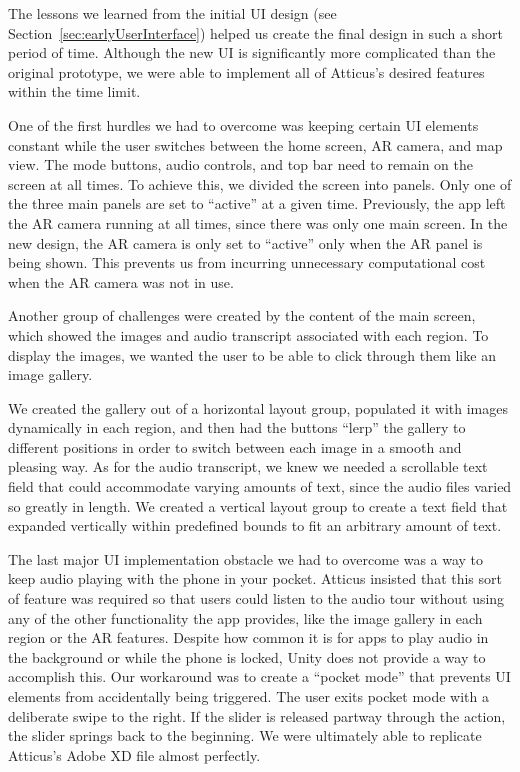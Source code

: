 \documentclass[a4paper, 10pt, american, titlepage]{article}
\begin{document}
The lessons we learned from the initial UI design (see
Section~\ref{sec:earlyUserInterface}) helped us create the final design in such
a short period of time. Although the new UI is significantly more complicated
than the original prototype, we were able to implement all of Atticus's desired
features within the time limit.

One of the first hurdles we had to overcome was keeping certain UI elements
constant while the user switches between the home screen, AR camera, and map
view. The mode buttons, audio controls, and top bar need to remain on the screen
at all times. To achieve this, we divided the screen into panels. Only one of
the three main panels are set to ``active'' at a given time. Previously, the app
left the AR camera running at all times, since there was only one main screen.
In the new design, the AR camera is only set to ``active'' only when the AR
panel is being shown. This prevents us from incurring unnecessary computational
cost when the AR camera was not in use.

Another group of challenges were created by the content of the main screen,
which showed the images and audio transcript associated with each region. To
display the images, we wanted the user to be able to click through them like
an image gallery.

We created the gallery out of a horizontal layout group, populated it with
images dynamically in each region, and then had the buttons ``lerp'' the gallery
to different positions in order to switch between each image in a smooth and
pleasing way. As for the audio transcript, we knew we needed a scrollable text
field that could accommodate varying amounts of text, since the audio files
varied so greatly in length. We created a vertical layout group to create a text
field that expanded vertically within predefined bounds to fit an arbitrary
amount of text.

The last major UI implementation obstacle we had to overcome was a way to keep
audio playing with the phone in your pocket. Atticus insisted that this sort of
feature was required so that users could listen to the audio tour without using
any of the other functionality the app provides, like the image gallery in each
region or the AR features. Despite how common it is for apps to play audio in
the background or while the phone is locked, Unity does not provide a way to
accomplish this. Our workaround was to create a ``pocket mode'' that prevents UI
elements from accidentally being triggered. The user exits pocket mode with a
deliberate swipe to the right. If the slider is released partway through the
action, the slider springs back to the beginning. We were ultimately able to
replicate Atticus's Adobe XD file almost perfectly.
\end{document}
